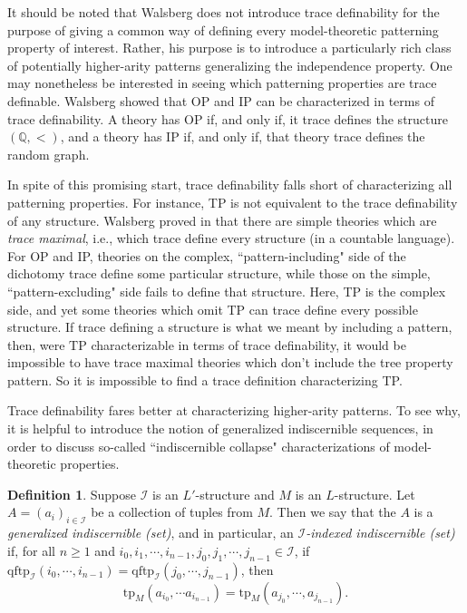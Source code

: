 \documentclass{article}
\newcommand{\bbQ}{\mathbb{Q}}
\newcommand{\calI}{\mathcal{I}}
\newcommand{\tp}{\text{tp}}
\newcommand{\qftp}{\text{qftp}}
\theoremstyle{definition}
\newtheorem{definition}{Definition}
\theoremstyle{definition}
\theoremstyle{definition}
\begin{document}
It should be noted that Walsberg does not introduce trace definability for the purpose of giving a common way of defining every model-theoretic patterning property of interest. Rather, his purpose is to introduce a particularly rich class of potentially higher-arity patterns generalizing the independence property. One may nonetheless be interested in seeing which patterning properties are trace definable. Walsberg showed that OP and IP can be characterized in terms of trace definability. A theory has OP if, and only if, it trace defines the structure $(\bbQ,<)$, and a theory has IP if, and only if, that theory trace defines the random graph. 

In spite of this promising start, trace definability falls short of characterizing all patterning properties. For instance, TP is not equivalent to the trace definability of any structure. Walsberg proved in \cite{walsberg2025trace} that there are simple theories which are \textit{trace maximal}, i.e., which trace define every structure (in a countable language). For OP and IP, theories on the complex, ``pattern-including" side of the dichotomy trace define some particular structure, while those on the simple, ``pattern-excluding" side fails to define that structure. Here, TP is the complex side, and yet some theories which omit TP can trace define every possible structure. If trace defining a structure is what we meant by including a pattern, then, were $\mathrm{TP}$ characterizable in terms of trace definability, it would be impossible to have trace maximal theories which don't include the tree property pattern. So it is impossible to find a trace definition characterizing TP. 


Trace definability fares better at characterizing higher-arity patterns. To see why, it is helpful to introduce the notion of generalized indiscernible sequences, in order to discuss so-called ``indiscernible collapse" characterizations of model-theoretic properties. 

\begin{definition}{}
Suppose $\calI$ is an $L'$-structure and $M$ is an $L$-structure. Let $A=(a_i)_{i\in \calI}$ be a collection of tuples from $M$. Then we say that the $A$ is a \textit{generalized indiscernible (set)}, and in particular, an $\calI$\textit{-indexed indiscernible (set)} if, for all $n\geq 1$ and $i_0,i_1,\dotsm, i_{n-1},j_0,j_1,\dotsm, j_{n-1}\in \calI$, if $\qftp_\calI(i_0,\dotsm, i_{n-1})=\qftp_\calI(j_0,\dotsm, j_{n-1})$, then $$\tp_M(a_{i_0},\dotsm a_{i_{n-1}})=\tp_M(a_{j_0},\dotsm, a_{j_{n-1}}).$$
\end{definition}
\end{document}
